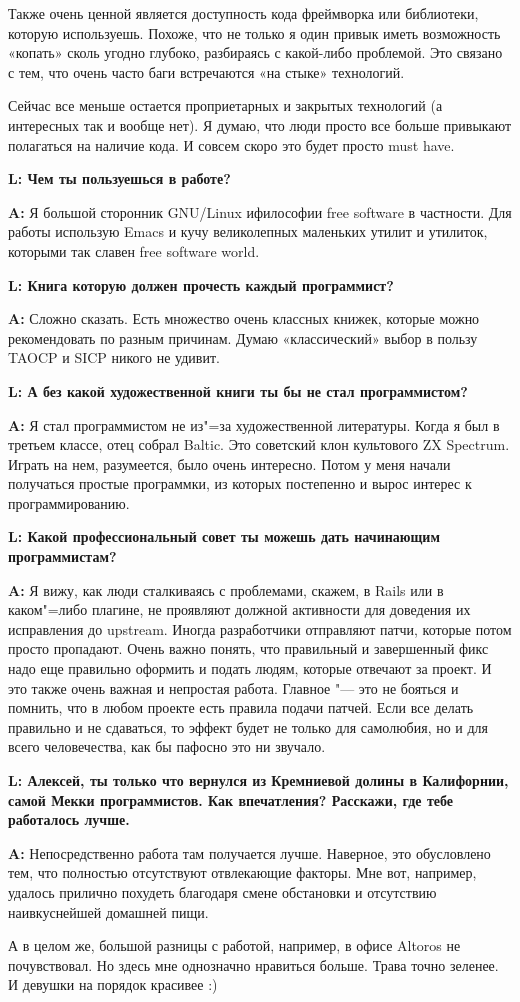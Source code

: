 \documentclass[10pt, a5paper]{article}
\begin{document}
Также очень ценной является доступность кода фреймворка или библиотеки, которую используешь. Похоже, что не только я один привык иметь возможность «копать» сколь угодно глубоко, разбираясь с какой-либо проблемой. Это связано с тем, что очень часто баги встречаются «на стыке» технологий.

Сейчас все меньше остается проприетарных и закрытых технологий (а интересных так и вообще нет). Я думаю, что люди просто все больше привыкают полагаться на наличие кода. И совсем скоро это будет просто must have.

{\noindent \bf L:  Чем ты пользуешься в работе?}

{\noindent \bf A:} Я большой сторонник GNU/Linux ифилософии free software в частности. Для работы использую Emacs и кучу великолепных маленьких утилит и утилиток, которыми так славен free software world.

{\noindent \bf L:  Книга которую должен прочесть каждый программист?}

{\noindent \bf A:} Сложно сказать. Есть множество очень классных книжек, которые можно рекомендовать по разным причинам. Думаю «классический» выбор в пользу TAOCP и SICP никого не удивит.

{\noindent \bf L:  А без какой художественной книги ты бы не стал программистом?}

{\noindent \bf A:} Я стал программистом не из"=за художественной литературы. Когда я был в третьем классе, отец собрал Baltic. Это советский клон культового ZX Spectrum. Играть на нем, разумеется, было очень интересно. Потом у меня начали получаться простые программки, из которых постепенно и вырос интерес к программированию.

{\noindent \bf L:  Какой профессиональный совет ты можешь дать начинающим программистам?}

{\noindent \bf A:} Я вижу, как люди сталкиваясь с проблемами, скажем, в Rails или в каком"=либо плагине, не проявляют должной активности для доведения их исправления до upstream. Иногда разработчики  отправляют патчи, которые потом просто пропадают. Очень важно понять, что правильный и завершенный фикс надо еще правильно оформить и подать людям, которые отвечают за проект. И это также очень важная и непростая работа. Главное "--- это не бояться и помнить, что в любом проекте есть правила подачи патчей. Если все делать правильно и не сдаваться, то эффект будет не только для самолюбия, но и для всего человечества, как бы пафосно это ни звучало.

{\noindent \bf L:  Алексей, ты только что вернулся из Кремниевой долины в Калифорнии, самой Мекки программистов. Как впечатления? Расскажи, где тебе работалось лучше.}

{\noindent \bf A:} Непосредственно работа там получается лучше. Наверное, это обусловлено тем, что полностью отсутствуют отвлекающие факторы. Мне вот, например, удалось прилично похудеть благодаря смене обстановки и отсутствию наивкуснейшей домашней пищи.

А в целом же, большой разницы с работой, например, в офисе Altoros не почувствовал. Но здесь мне однозначно нравиться больше. Трава точно зеленее. И девушки на порядок красивее :)
\end{document}
